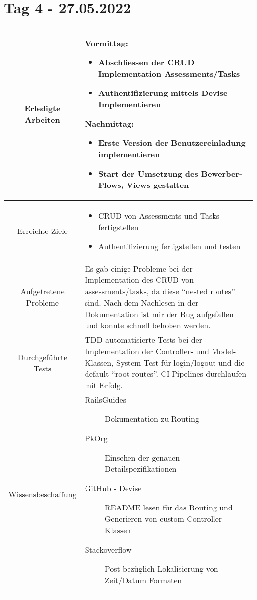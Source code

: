\section{Tag 4 - 27.05.2022}

\begin{tabularx}{\textwidth}[H]{|c|X|}
    \hline
    Erledigte Arbeiten         &
    \textbf{Vormittag:}
    \begin{itemize}
        \item Abschliessen der CRUD Implementation Assessments/Tasks
        \item Authentifizierung mittels Devise Implementieren
    \end{itemize}
    \textbf{Nachmittag:}
    \begin{itemize}
        \item Erste Version der Benutzereinladung implementieren
        \item Start der Umsetzung des Bewerber-Flows, Views gestalten
    \end{itemize}
    \\ \hline

    Erreichte Ziele            &
    \begin{itemize}
        \item CRUD von Assessments und Tasks fertigstellen
        \item Authentifizierung fertigstellen und testen
    \end{itemize}
    \\ \hline

    Aufgetretene Probleme      &
    Es gab einige Probleme bei der Implementation des CRUD von assessments/tasks, da diese \enquote{nested routes} sind.
    Nach dem Nachlesen in der Dokumentation ist mir der Bug aufgefallen und konnte schnell behoben werden.
    \\ \hline

    Durchgeführte Tests        &
    TDD automatisierte Tests bei der Implementation der Controller- und Model-Klassen,
    System Test für login/logout und die default \enquote{root routes}. CI-Pipelines durchlaufen mit Erfolg.
    \\ \hline

    Wissensbeschaffung         &
    \begin{description}
        \item[RailsGuides] Dokumentation zu Routing
        \item[PkOrg] Einsehen der genauen Detailspezifikationen
        \item[GitHub - Devise] README lesen für das Routing und Generieren von custom Controller-Klassen
        \item[Stackoverflow] Post bezüglich Lokalisierung von Zeit/Datum Formaten
    \end{description}
    \\ \hline


\end{tabularx}
